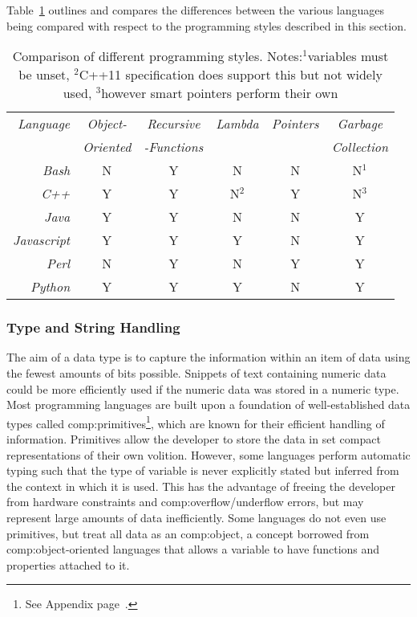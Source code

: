 Table~\ref{table:haplo:complang} outlines and compares the differences between the various languages being compared with respect to the programming styles described in this section.

\begin{table}[h]
\begin{center}
\begin{tabular}{ r c c c c c } \toprule
\emph{Language} & \emph{Object-} & \emph{Recursive} & \emph{Lambda} & \emph{Pointers} & \emph{Garbage} \\
& \emph{Oriented} & \emph{-Functions} & & & \emph{Collection} \\
\midrule
\textit{Bash} & N & Y & N & N & N$^1$ \\
\textit{C++} &  Y & Y & N$^2$ & Y & N$^3$ \\
\textit{Java} & Y & Y & N & N & Y \\
\textit{Javascript} & Y & Y & Y & N & Y \\
\textit{Perl} & N & Y & N & Y & Y \\
\textit{Python} & Y & Y & Y & N & Y \\ \bottomrule
\hline
\end{tabular}
\end{center}
\caption[Comparison of different programming styles]{Comparison of different programming styles. Notes:$^1$variables must be unset, $^2$C++11 specification does support this but not widely used, $^3$however smart pointers  perform their own \cite{embedded1999embedded}}\label{table:haplo:complang}
\end{table}


\subsubsection{Type and String Handling}

The aim of a data type is to capture the information within an item of data using the fewest amounts of bits possible. Snippets of text containing numeric data could be more efficiently used if the numeric data was stored in a numeric type.  Most programming languages are built upon a foundation of  well-established data types called \gls{comp:primitives}\footnote{See Appendix page~\pageref{ref:app:primitives}.}, which are known for their efficient handling of information. Primitives allow the developer to store the data in set compact representations of their own volition. However, some languages perform automatic typing such that the type of variable is never explicitly stated but inferred from the context in which it is used. This has the advantage of freeing the developer from hardware constraints and \gls{comp:overflow/underflow} errors, but may represent large amounts of data inefficiently. Some languages do not even use primitives, but treat all data as an \gls{comp:object}, a concept borrowed from \gls{comp:object-oriented} languages  that allows a variable to have functions and properties attached to it.

